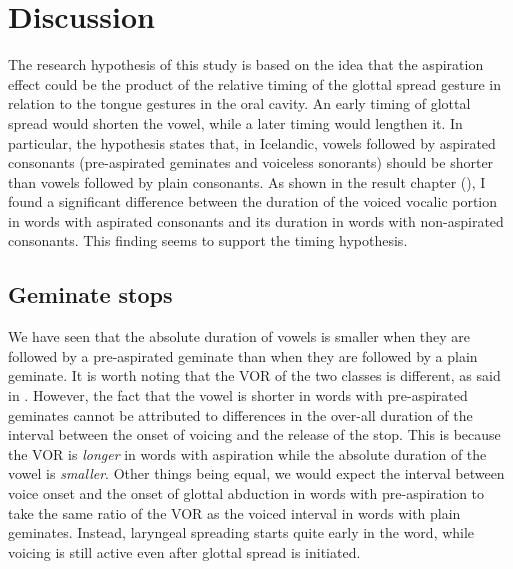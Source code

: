 \documentclass[11pt,a4paper,openany]{memoir}\usepackage[]{graphicx}\usepackage[]{color}
\begin{document}





\chapter{Discussion}

The research hypothesis of this study is based on the idea that the aspiration effect could be the product of the relative timing of the glottal spread gesture in relation to the tongue gestures in the oral cavity.
An early timing of glottal spread would shorten the vowel, while a later timing would lengthen it.
In particular, the hypothesis states that, in Icelandic, vowels followed by aspirated consonants (pre-aspirated geminates and voiceless sonorants) should be shorter than vowels followed by plain consonants.
As shown in the result chapter (), I found a significant difference between the duration of the voiced vocalic portion in words with aspirated consonants and its duration in words with non-aspirated consonants.
This finding seems to support the timing hypothesis.

\section{Geminate stops}
We have seen that the absolute duration of vowels is smaller when they are followed by a pre-aspirated geminate than when they are followed by a plain geminate.
It is worth noting that the VOR of the two classes is different, as said in .
However, the fact that the vowel is shorter in words with pre-aspirated geminates cannot be attributed to differences in the over-all duration of the interval between the onset of voicing and the release of the stop.
This is because the VOR is \textit{longer} in words with aspiration while the absolute duration of the vowel is \textit{smaller}.
Other things being equal, we would expect the interval between voice onset and the onset of glottal abduction in words with pre-aspiration to take the same ratio of the VOR as the voiced interval in words with plain geminates.
Instead, laryngeal spreading starts quite early in the word, while voicing is still active even after glottal spread is initiated.
\end{document}
